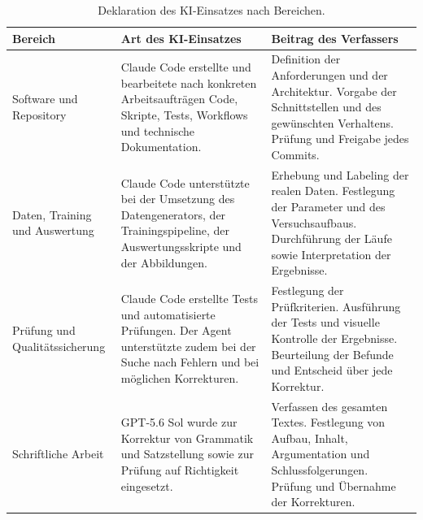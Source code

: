 \begin{table}[H]
\centering\small
\begin{tabularx}{\textwidth}{@{}>{\raggedright\arraybackslash}p{3.0cm}YY@{}}
\toprule
\textbf{Bereich} & \textbf{Art des KI-Einsatzes} & \textbf{Beitrag des Verfassers} \\
\midrule
Software und Repository &
Claude Code erstellte und bearbeitete nach konkreten Arbeitsaufträgen Code,
Skripte, Tests, Workflows und technische Dokumentation. &
Definition der Anforderungen und der Architektur. Vorgabe der Schnittstellen
und des gewünschten Verhaltens. Prüfung und Freigabe jedes Commits. \\
\addlinespace
Daten, Training und Auswertung &
Claude Code unterstützte bei der Umsetzung des Datengenerators, der
Trainingspipeline, der Auswertungsskripte und der Abbildungen. &
Erhebung und Labeling der realen Daten. Festlegung der Parameter und des
Versuchsaufbaus. Durchführung der Läufe sowie Interpretation der Ergebnisse. \\
\addlinespace
Prüfung und Qualitätssicherung &
Claude Code erstellte Tests und automatisierte Prüfungen. Der Agent
unterstützte zudem bei der Suche nach Fehlern und bei möglichen Korrekturen. &
Festlegung der Prüfkriterien. Ausführung der Tests und visuelle Kontrolle der
Ergebnisse. Beurteilung der Befunde und Entscheid über jede Korrektur. \\
\addlinespace
Schriftliche Arbeit &
GPT-5.6 Sol wurde zur Korrektur von Grammatik und Satzstellung sowie zur
Prüfung auf Richtigkeit eingesetzt. &
Verfassen des gesamten Textes. Festlegung von Aufbau, Inhalt,
Argumentation und Schlussfolgerungen. Prüfung und Übernahme der Korrekturen. \\
\bottomrule
\end{tabularx}
\caption{Deklaration des KI-Einsatzes nach Bereichen.}
\label{tab:ki-deklaration}
\end{table}
